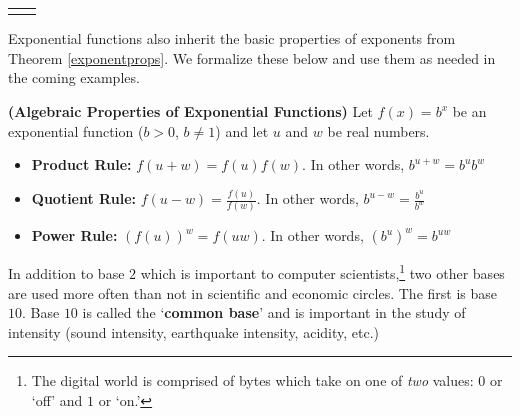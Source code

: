 \documentclass{ximera}
\begin{document}
\begin{theorem}
\begin{tabular}{m{2.5in}m{2.5in}}
\begin{itemize}
\begin{itemize}
\end{itemize}

\end{itemize} \\

\end{tabular}

\end{theorem}


 


Exponential functions also inherit the basic properties of exponents from Theorem \ref{exponentprops}.  We formalize these below and use them as needed in the coming examples.



\begin{theorem}  \label{algpropexpfcns} \textbf{(Algebraic Properties of Exponential Functions)}  Let $f(x) = b^{x}$ be an exponential function ($b > 0$, $b\neq 1$) and let $u$ and $w$ be real numbers. 

\begin{itemize}

\item  \textbf{Product Rule:}  $f(u+w) = f(u) f(w)$.  In other words, $b^{u+w} = b^{u} b^{w}$

\item  \textbf{Quotient Rule:}  $f(u-w) = \frac{f(u)}{f(w)}$.  In other words, $b^{u-w} = \frac{b^{u}}{b^{w}}$

\item  \textbf{Power Rule:}  $\left(f(u)\right)^w = f(uw)$.  In other words, $\left(b^{u}\right)^{w} = b^{uw}$

\end{itemize}

\end{theorem}


 

In addition to base $2$ which is important to computer scientists,\footnote{The digital world is comprised of bytes which take on one of \textit{two} values: $0$ or `off' and $1$ or `on.'} two other bases are used more often than not in scientific and economic circles.  The first is base  $10$.  Base $10$ is called the `\textbf{common base}' and is important in the study of intensity (sound intensity, earthquake intensity, acidity, etc.)   
\end{document}
